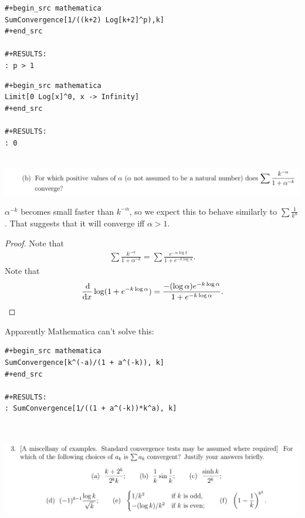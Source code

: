 \documentclass[12pt]{article}
\begin{document}

\begin{verbatim}
#+begin_src mathematica
SumConvergence[1/((k+2) Log[k+2]^p),k]
#+end_src

#+RESULTS:
: p > 1

\end{verbatim}

\begin{verbatim}
#+begin_src mathematica
Limit[0 Log[x]^0, x -> Infinity]
#+end_src

#+RESULTS:
: 0


\end{verbatim}


\newpage
\begin{mdframed}
\includegraphics[width=400pt]{img/analysis--oxford-M2-I-6-2-b.png}
\end{mdframed}

\begin{remark*}
  $\alpha^{-k}$ becomes small faster than $k^{-\alpha}$, so we expect this to behave similarly to
  $\sum \frac{1}{k^\alpha}$. That suggests that it will converge iff $\alpha > 1$.
\end{remark*}

\begin{proof}
  Note that
  \begin{align*}
    \sum \frac{k^{-\alpha}}{1 + \alpha^{-k}} =
    \sum \frac{e^{-\alpha \log k}}{1 + e^{-k \log \alpha}}.
  \end{align*}
  Note that
  \begin{align*}
    \ddx \log(1 + e^{-k \log \alpha}) =
    \frac{-(\log\alpha) e^{-k\log\alpha}}{1 + e^{-k \log \alpha}}.
  \end{align*}
\end{proof}

Apparently Mathematica can't solve this:

\begin{verbatim}
#+begin_src mathematica
SumConvergence[k^(-a)/(1 + a^(-k)), k]
#+end_src

#+RESULTS:
: SumConvergence[1/((1 + a^(-k))*k^a), k]


\end{verbatim}


\newpage
\subsection{}
\begin{mdframed}
  \includegraphics[width=400pt]{img/analysis--oxford-M2-I-6-3.png}
\end{mdframed}
\end{document}
